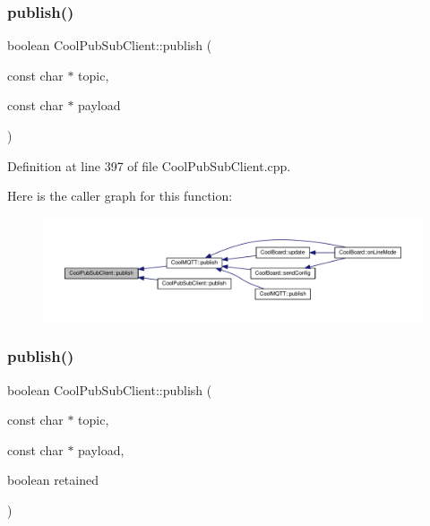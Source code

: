 \subsubsection{\texorpdfstring{publish()}{publish()}\hspace{0.1cm}{\footnotesize\ttfamily [1/4]}}
{\footnotesize\ttfamily boolean Cool\+Pub\+Sub\+Client\+::publish (\begin{DoxyParamCaption}\item[{const char $\ast$}]{topic,  }\item[{const char $\ast$}]{payload }\end{DoxyParamCaption})}



Definition at line 397 of file Cool\+Pub\+Sub\+Client.\+cpp.

Here is the caller graph for this function\+:\nopagebreak
\begin{figure}[H]
\begin{center}
\leavevmode
\includegraphics[width=350pt]{class_cool_pub_sub_client_ab6ad5fa2d3db8f91454027257f225a89_icgraph}
\end{center}
\end{figure}
\mbox{\label{class_cool_pub_sub_client_a0b01cef98af0b57d8da4df373e196448}} 
\subsubsection{\texorpdfstring{publish()}{publish()}\hspace{0.1cm}{\footnotesize\ttfamily [2/4]}}
{\footnotesize\ttfamily boolean Cool\+Pub\+Sub\+Client\+::publish (\begin{DoxyParamCaption}\item[{const char $\ast$}]{topic,  }\item[{const char $\ast$}]{payload,  }\item[{boolean}]{retained }\end{DoxyParamCaption})}



